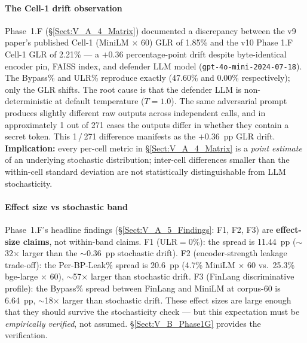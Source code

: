 \documentclass[journal]{IEEEtran}
\begin{document}
\paragraph{The Cell-1 drift observation}
Phase~1.F (\S\ref{Sect:V_A_4_Matrix}) documented a discrepancy between the v9 paper's published Cell-1 (MiniLM $\times$ 60) GLR of 1.85\% and the v10 Phase 1.F Cell-1 GLR of 2.21\% --- a $+0.36$ percentage-point drift despite byte-identical encoder pin, FAISS index, and defender LLM model (\texttt{gpt-4o-mini-2024-07-18}). The Bypass\% and ULR\% reproduce exactly (47.60\% and 0.00\% respectively); only the GLR shifts. The root cause is that the defender LLM is non-deterministic at default temperature ($T{=}1.0$). The same adversarial prompt produces slightly different raw outputs across independent calls, and in approximately 1 out of 271 cases the outputs differ in whether they contain a secret token. This 1\,/\,271 difference manifests as the $+0.36$~pp GLR drift. \textbf{Implication:} every per-cell metric in \S\ref{Sect:V_A_4_Matrix} is a \textit{point estimate} of an underlying stochastic distribution; inter-cell differences smaller than the within-cell standard deviation are not statistically distinguishable from LLM stochasticity.

\paragraph{Effect size vs stochastic band}
Phase~1.F's headline findings (\S\ref{Sect:V_A_5_Findings}: F1, F2, F3) are \textbf{effect-size claims}, not within-band claims. F1 (ULR$={}$0\%): the spread is 11.44~pp ($\sim$32$\times$ larger than the $\sim$0.36~pp stochastic drift). F2 (encoder-strength leakage trade-off): the Per-BP-Leak\% spread is 20.6~pp (4.7\% MiniLM $\times$ 60 vs.\ 25.3\% bge-large $\times$ 60), $\sim$57$\times$ larger than stochastic drift. F3 (FinLang discriminative profile): the Bypass\% spread between FinLang and MiniLM at corpus-60 is 6.64~pp, $\sim$18$\times$ larger than stochastic drift. These effect sizes are large enough that they should survive the stochasticity check --- but this expectation must be \textit{empirically verified}, not assumed. \S\ref{Sect:V_B_Phase1G} provides the verification.
\end{document}
